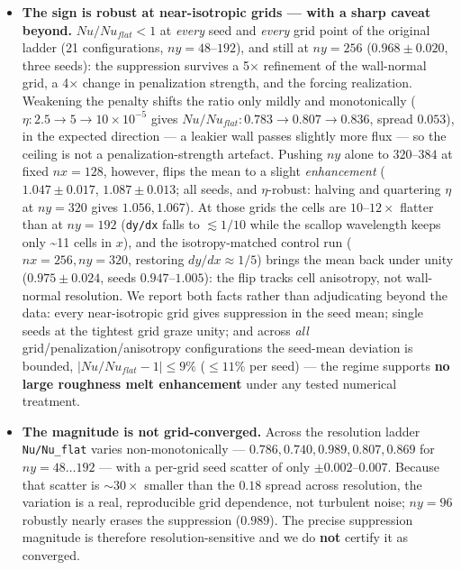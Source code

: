 \documentclass[tc, manuscript]{copernicus}
\begin{document}
\begin{itemize}
\item \textbf{The sign is robust at near-isotropic grids — with a sharp caveat beyond.} $Nu/Nu_{flat}<1$ at \emph{every} seed and \emph{every} grid point of the original ladder (21 configurations, $ny=48\mbox{--}192$), and still at $ny=256$ ($0.968\pm 0.020$, three seeds): the suppression survives a 5\ensuremath{\times} refinement of the wall-normal grid, a 4\ensuremath{\times} change in penalization strength, and the forcing realization. Weakening the penalty shifts the ratio only mildly and monotonically ($\eta : 2.5\to 5\to 10\times 10^{-5}$ gives $Nu/Nu_{flat}: 0.783\to 0.807\to 0.836$, spread $0.053$), in the expected direction — a leakier wall passes slightly more flux — so the ceiling is not a penalization-strength artefact. Pushing $ny$ alone to $320\mbox{--}384$ at fixed $nx=128$, however, flips the mean to a slight \emph{enhancement} ($1.047\pm 0.017$, $1.087\pm 0.013$; all seeds, and \ensuremath{\eta}-robust: halving and quartering $\eta $ at $ny=320$ gives $1.056, 1.067$). At those grids the cells are $10\mbox{--}12\times $ flatter than at $ny=192$ (\texttt{dy/\allowbreak{}dx} falls to $\lesssim 1/10$ while the scallop wavelength keeps only \textasciitilde{}11 cells in $x$), and the isotropy-matched control run ($nx=256, ny=320$, restoring $dy/dx\approx 1/5$) brings the mean back under unity ($0.975\pm 0.024$, seeds $0.947\mbox{--}1.005$): the flip tracks cell anisotropy, not wall-normal resolution. We report both facts rather than adjudicating beyond the data: every near-isotropic grid gives suppression in the seed mean; single seeds at the tightest grid graze unity; and across \emph{all} grid/penalization/anisotropy configurations the seed-mean deviation is bounded, $|Nu/Nu_{flat}-1| \le  9\%$ ($\le  11\%$ per seed) — the regime supports \textbf{no large roughness melt enhancement} under any tested numerical treatment.
\item \textbf{The magnitude is not grid-converged.} Across the resolution ladder \texttt{Nu/\allowbreak{}Nu\_\allowbreak{}flat} varies non-monotonically — $0.786, 0.740, 0.989, 0.807, 0.869$ for $ny=48\ldots 192$ — with a per-grid seed scatter of only $\pm 0.002\mbox{--}0.007$. Because that scatter is $\sim 30\times $ smaller than the $0.18$ spread across resolution, the variation is a real, reproducible grid dependence, not turbulent noise; $ny=96$ robustly nearly erases the suppression ($0.989$). The precise suppression magnitude is therefore resolution-sensitive and we do \textbf{not} certify it as converged.
\end{itemize}
\end{document}
